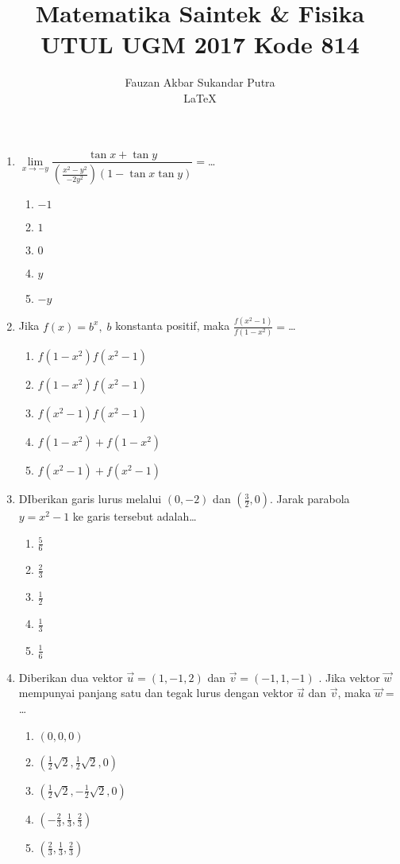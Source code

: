 \documentclass[A4,12PT, english, twocolumn]{journal}
\title{Matematika Saintek \& Fisika UTUL UGM 2017 Kode 814}
\author{Fauzan Akbar Sukandar Putra \\ \LaTeX}
\begin{document}
\maketitle

\begin{enumerate}

\item $\lim\limits_{x \longrightarrow -y}\dfrac{\tan{x} + \tan{y}}{\left( \frac{x^2 - y^2}{-2y^2} \right) \left( 1 - \tan{x}\tan{y} \right)}=$\dots
    \begin{enumerate}
        \item $-1$
        \item $1$
        \item $0$
        \item $y$
        \item $-y$
    \end{enumerate}

\item Jika $f(x) = b^x, \; b$ konstanta positif, maka $\frac{f \left( x^2 -1 \right)}{f \left( 1-x^2 \right)}=$\dots
    \begin{enumerate}
        \item $f(1 - x^2)f(x^2 - 1)$
        \item $f(1 - x^2)f(x^2 - 1)$
        \item $f(x^2 - 1)f(  x^2 - 1)$
        \item $f(1 - x^2) + f(1 - x^2)$
        \item $f(x^2 - 1) + f(  x^2 - 1)$
    \end{enumerate}

\item DIberikan garis lurus melalui $(0,-2)$ dan $\left( \frac{3}{2} , 0 \right)$. Jarak parabola $ y = x^2 - 1 $ ke garis tersebut adalah\dots
	\begin{enumerate}
       \item $\frac{5}{6}$ 
       \item $\frac{2}{3}$    
       \item $\frac{1}{2}$ 
       \item $\frac{1}{3}$   
       \item $\frac{1}{6}$
	\end{enumerate}

\item Diberikan dua vektor $\vec{u} = (1, -1, 2)$ dan $\vec{v} = (-1,1,-1)$ . Jika vektor $\vec{w}$ mempunyai panjang satu dan tegak lurus dengan vektor $\vec{u}$ dan $\vec{v}$, maka $\vec{w} =$\dots
	\begin{enumerate}
       \item $(0,0,0)$
       \item $\left( \frac{1}{2}\sqrt{2}, \frac{1}{2}\sqrt{2}, 0 \right)$
       \item $\left( \frac{1}{2}\sqrt{2}, -\frac{1}{2}\sqrt{2}, 0   \right)$
       \item $\left( -\frac{2}{3}, \frac{1}{3}, \frac{2}{3} \right)$
       \item $ \left( \frac{2}{3} , \frac{1}{3}, \frac{2}{3} \right)$
	\end{enumerate}  


\end{enumerate}
\end{document}
